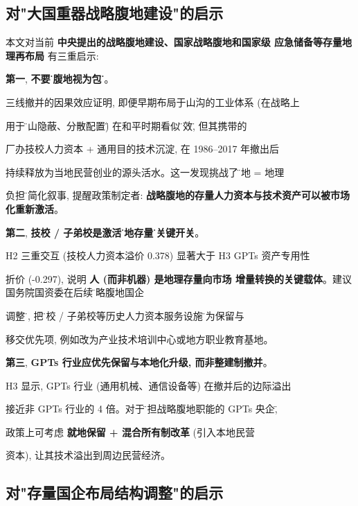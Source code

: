 \subsection{对"大国重器战略腹地建设"的启示}



本文对当前 \textbf{中央提出的战略腹地建设、国家战略腹地和国家级
应急储备等存量地理再布局} 有三重启示:



\textbf{第一}, \textbf{不要\"将腹地视为包袱\"}。

       三线撤并的因果效应证明, 即便早期布局于山沟的工业体系 (在战略上

       用于\"靠山隐蔽、分散配置\") 在和平时期看似\"低效\", 但其携带的

       厂办技校人力资本 + 通用目的技术沉淀, 在 1986--2017 年撤出后

       持续释放为当地民营创业的源头活水。这一发现挑战了\"腹地 = 地理

       负担\"的简化叙事, 提醒政策制定者: \textbf{战略腹地的存量人力资本与技术资产可以被市场化重新激活}。



\textbf{第二}, \textbf{技校 / 子弟校是激活\"腹地存量\"的关键开关}。

       H2 三重交互 (技校人力资本溢价 0.378) 显著大于 H3 GPTs 资产专用性

       折价 (-0.297), 说明 \textbf{人 (而非机器) 是地理存量向市场
       增量转换的关键载体}。建议国务院国资委在后续\"战略腹地国企

       调整\"中, 把\"技校 / 子弟校等历史人力资本服务设施\"作为保留与

       移交优先项, 例如改为产业技术培训中心或地方职业教育基地。



\textbf{第三}, \textbf{GPTs 行业应优先保留与本地化升级, 而非整建制撤并}。

       H3 显示, GPTs 行业 (通用机械、通信设备等) 在撤并后的边际溢出

       接近非 GPTs 行业的 4 倍。对于\"承担战略腹地职能的 GPTs 央企\",

       政策上可考虑 \textbf{就地保留 + 混合所有制改革} (引入本地民营

       资本), 让其技术溢出到周边民营经济。



\subsection{对"存量国企布局结构调整"的启示}



